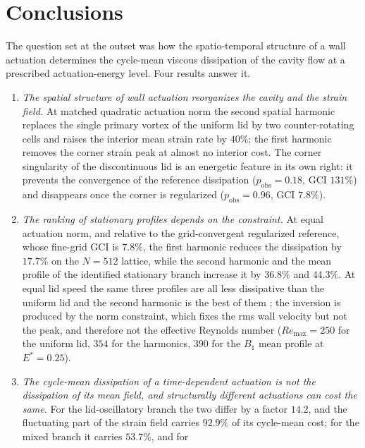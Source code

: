 \documentclass[11pt,a4paper]{article}
\begin{document}
\section{Conclusions}
\label{sec:conclusions}

The question set at the outset was how the spatio-temporal structure of a wall
actuation determines the cycle-mean viscous dissipation of the cavity flow at a
prescribed actuation-energy level. Four results answer it.

\begin{enumerate}
\item \emph{The spatial structure of wall actuation reorganizes the cavity and the
strain field.} At matched quadratic actuation norm the second spatial harmonic
replaces the single primary vortex of the uniform lid by two counter-rotating
cells and raises the interior mean strain rate by $40\%$; the first harmonic
removes the corner strain peak at almost no interior cost. The corner singularity
of the discontinuous lid is an energetic feature in its own right: it prevents the
convergence of the reference dissipation ($p_{\mathrm{obs}}=0.18$,
GCI $131\%$) and disappears once the corner is regularized
($p_{\mathrm{obs}}=0.96$, GCI $7.8\%$).
\item \emph{The ranking of stationary profiles depends on the constraint.} At
equal actuation norm, and relative to the grid-convergent regularized reference,
whose fine-grid GCI is $7.8\%$, the first harmonic reduces the dissipation by
$17.7\%$ on the $N=512$ lattice, while the second harmonic
and the mean profile of the identified stationary branch increase it by $36.8\%$
and $44.3\%$. At equal lid speed the same three profiles are all less dissipative
than the uniform lid and the second harmonic is the best of them
\cite{beniaiche2026}; the inversion is produced by the norm constraint, which
fixes the rms wall velocity but not the peak, and therefore not the effective
Reynolds number ($Re_{\max}=250$ for the uniform lid, $354$ for the harmonics,
$390$ for the $B_1$ mean profile at $E^\ast=0.25$).
\item \emph{The cycle-mean dissipation of a time-dependent actuation is not the
dissipation of its mean field, and structurally different actuations can cost the
same.} For the lid-oscillatory branch the two
differ by a factor $14.2$, and the fluctuating part of the strain field carries
$92.9\%$ of its cycle-mean cost; for the mixed branch it carries $53.7\%$, and for

\end{enumerate}
\end{document}
